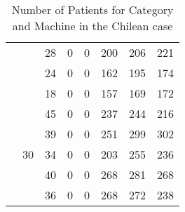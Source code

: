 \begin{table}[h]
\begin{tabular}{cc|c|c|c|c|c|c|}
\multicolumn{1}{|c|}{}                     &                     & 28              & 0             & 0               & 200           & 206             & 221           \\ \cline{3-8} 
\multicolumn{1}{|c|}{}                     &                     & 24              & 0             & 0               & 162           & 195             & 174           \\ \cline{3-8} 
\multicolumn{1}{|c|}{}                     &                     & 18              & 0             & 0               & 157           & 169             & 172           \\ \cline{2-8} 
\multicolumn{1}{|c|}{}                     & \multirow{5}{*}{30} & 45              & 0             & 0               & 237           & 244             & 216           \\ \cline{3-8} 
\multicolumn{1}{|c|}{}                     &                     & 39              & 0             & 0               & 251           & 299             & 302           \\ \cline{3-8} 
\multicolumn{1}{|c|}{}                     &                     & 34              & 0             & 0               & 203           & 255             & 236           \\ \cline{3-8} 
\multicolumn{1}{|c|}{}                     &                     & 40              & 0             & 0               & 268           & 281             & 268           \\ \cline{3-8} 
\multicolumn{1}{|c|}{}                     &                     & 36              & 0             & 0               & 268           & 272             & 238           \\ \hline
\end{tabular}
\caption{Number of Patients for Category and Machine in the Chilean case}
\end{table}
